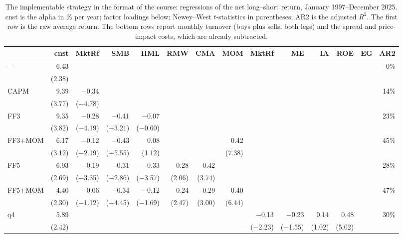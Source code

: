 \documentclass[12pt,a4paper]{article}
\begin{document}
\begin{singlespace}
\begin{table}[!htbp]\centering
\caption{The implementable strategy in the format of the course: regressions of the net long--short return, January 1997--December 2025. cnst is the alpha in \% per year; factor loadings below; Newey--West $t$-statistics in parentheses; AR2 is the adjusted $R^2$. The first row is the raw average return. The bottom rows report monthly turnover (buys plus sells, both legs) and the spread and price-impact costs, which are already subtracted.}\label{tab:lecture}
\scriptsize\setlength{\tabcolsep}{1.3pt}
\begin{tabular}{lrrrrrrrrrrrrr}\toprule
 & cnst & MktRf & SMB & HML & RMW & CMA & MOM & MktRf & ME & IA & ROE & EG & AR2\\\midrule
--- & 6.43 &  &  &  &  &  &  &  &  &  &  &  & 0\%\\
 & (2.38) &  &  &  &  &  &  &  &  &  &  &  & \\
CAPM & 9.39 & \ensuremath{-}0.34 &  &  &  &  &  &  &  &  &  &  & 14\%\\
 & (3.77) & (\ensuremath{-}4.78) &  &  &  &  &  &  &  &  &  &  & \\
FF3 & 9.35 & \ensuremath{-}0.28 & \ensuremath{-}0.41 & \ensuremath{-}0.07 &  &  &  &  &  &  &  &  & 23\%\\
 & (3.82) & (\ensuremath{-}4.19) & (\ensuremath{-}3.21) & (\ensuremath{-}0.60) &  &  &  &  &  &  &  &  & \\
FF3+MOM & 6.17 & \ensuremath{-}0.12 & \ensuremath{-}0.43 & 0.08 &  &  & 0.42 &  &  &  &  &  & 45\%\\
 & (3.12) & (\ensuremath{-}2.19) & (\ensuremath{-}5.55) & (1.12) &  &  & (7.38) &  &  &  &  &  & \\
FF5 & 6.93 & \ensuremath{-}0.19 & \ensuremath{-}0.31 & \ensuremath{-}0.33 & 0.28 & 0.42 &  &  &  &  &  &  & 28\%\\
 & (2.69) & (\ensuremath{-}3.35) & (\ensuremath{-}2.86) & (\ensuremath{-}3.57) & (2.06) & (3.74) &  &  &  &  &  &  & \\
FF5+MOM & 4.40 & \ensuremath{-}0.06 & \ensuremath{-}0.34 & \ensuremath{-}0.12 & 0.24 & 0.29 & 0.40 &  &  &  &  &  & 47\%\\
 & (2.30) & (\ensuremath{-}1.12) & (\ensuremath{-}4.45) & (\ensuremath{-}1.69) & (2.47) & (3.00) & (6.44) &  &  &  &  &  & \\
q4 & 5.89 &  &  &  &  &  &  & \ensuremath{-}0.13 & \ensuremath{-}0.23 & 0.14 & 0.48 &  & 30\%\\
 & (2.42) &  &  &  &  &  &  & (\ensuremath{-}2.23) & (\ensuremath{-}1.55) & (1.02) & (5.02) &  & \\

\end{tabular}
\end{table}
\end{singlespace}
\end{document}
